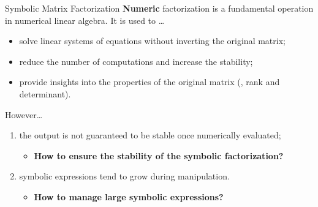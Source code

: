 \begin{frame}{Symbolic Matrix Factorization}
  \textbf{Numeric} factorization is a fundamental operation in numerical linear algebra. It is used to \dots
  \begin{itemize}
    \item solve linear systems of equations without inverting the original matrix;
    \item reduce the number of computations and increase the stability;
    \item provide insights into the properties of the original matrix (\ie{}, rank and determinant).
  \end{itemize}
  \vspace{1.0em}
  \vspace{1.0em}
  However\dots
  \begin{enumerate}
    \item the output is not guaranteed to be stable once numerically evaluated;
    \begin{itemize}
      \item[] \textbf{How to ensure the stability of the symbolic factorization?}
    \end{itemize}
    \item symbolic expressions tend to grow during manipulation.
    \begin{itemize}
      \item[] \textbf{How to manage large symbolic expressions?}
    \end{itemize}
  \end{enumerate}
\end{frame}

